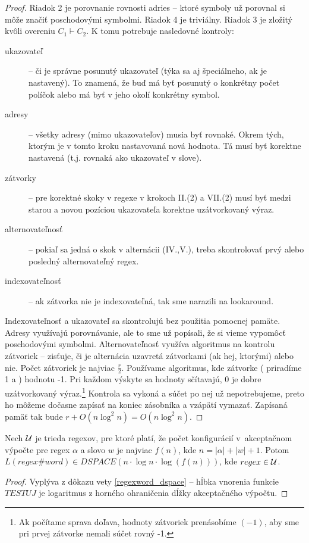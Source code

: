 \documentclass{svk_long_sk}
\begin{document}
\begin{proof}
Riadok 2 je porovnanie rovnosti adries -- ktoré symboly už porovnal si môže značiť poschodovými symbolmi. Riadok 4 je triviálny. Riadok 3 je zložitý kvôli overeniu $C_1\vdash C_2$. K tomu potrebuje nasledovné kontroly:
\begin{description}
\item[ukazovateľ] -- či je správne posunutý ukazovateľ (týka sa aj špeciálneho, ak je nastavený). To znamená, že buď má byť posunutý o konkrétny počet políčok alebo má byť v jeho okolí konkrétny symbol.
\item[adresy] -- všetky adresy (mimo ukazovateľov) musia byť rovnaké. Okrem tých, ktorým je v tomto kroku nastavovaná nová hodnota. Tá musí byť korektne nastavená (t.j. rovnaká ako ukazovateľ v slove). 
\item[zátvorky] -- pre korektné skoky v regexe v krokoch II.(2) a VII.(2) musí byť medzi starou a novou pozíciou ukazovateľa korektne uzátvorkovaný výraz.
\item[alternovateľnosť] -- pokiaľ sa jedná o skok v alternácii (IV.,V.), treba skontrolovať prvý alebo posledný alternovateľný regex.
\item[indexovateľnosť] -- ak zátvorka nie je indexovateľná, tak sme narazili na lookaround.
\end{description}
Indexovateľnosť a ukazovateľ sa skontrolujú bez použitia pomocnej pamäte. Adresy využívajú porovnávanie, ale to sme už popísali, že si vieme vypomôcť poschodovými symbolmi. Alternovateľnosť využíva algoritmus na kontrolu zátvoriek -- zisťuje, či je alternácia uzavretá zátvorkami (ak hej, ktorými) alebo nie. Počet zátvoriek je najviac $\frac{r}{2}$. Používame algoritmus, kde zátvorke ( priradíme 1 a ) hodnotu -1. Pri každom výskyte sa hodnoty sčítavajú, 0 je dobre uzátvorkovaný výraz.\footnote{Ak počítame sprava doľava, hodnoty zátvoriek prenásobíme $(-1)$, aby sme pri prvej zátvorke nemali súčet rovný -1.} Kontrola sa vykoná a súčet po nej už nepotrebujeme, preto ho môžeme dočasne zapísať na koniec zásobníka a vzápätí vymazať. Zapísaná pamäť tak bude $r+O(n\log^2n)=O(n\log^2n)$.
\end{proof}

\begin{corollary}
Nech $\cal U$ je trieda regexov, pre ktoré platí, že počet konfigurácií v~akceptačnom výpočte pre regex $\alpha$ a slovo $w$ je najviac $f(n)$, kde $n=|\alpha|+|w|+1$. Potom $L(regex\#word)\in DSPACE(n\cdot\log n\cdot \log (f(n)))$, kde $regex \in \cal U$.
\end{corollary}
\begin{proof}
Vyplýva z dôkazu vety \ref{regexword_dspace} -- hĺbka vnorenia funkcie $TESTUJ$ je logaritmus z horného ohraničenia dĺžky akceptačného výpočtu.
\end{proof}
\end{document}
